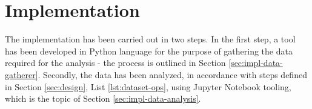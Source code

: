 \section{Implementation}\label{sec:implementation}
The implementation has been carried out in two steps. In the first step, a tool has been developed in Python language for the purpose of gathering the data required for the analysis - the process is outlined in Section \ref{sec:impl-data-gatherer}. Secondly, the data has been analyzed, in accordance with steps defined in Section \ref{sec:design}, List \ref{lst:dataset-ops}, using Jupyter Notebook tooling, which is the topic of Section \ref{sec:impl-data-analysis}.









